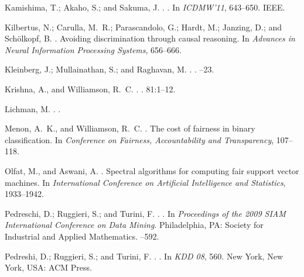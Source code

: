 \documentclass[letterpaper]{article} %
\begin{document}
\begin{thebibliography}{}
Kamishima, T.; Akaho, S.; and Sakuma, J.
.
.
\newblock In {\em ICDMW'11},  643--650.
\newblock IEEE.

Kilbertus, N.; Carulla, M.~R.; Parascandolo, G.; Hardt, M.; Janzing, D.; and
  Sch{\"o}lkopf, B.
.
\newblock Avoiding discrimination through causal reasoning.
\newblock In {\em Advances in Neural Information Processing Systems},
  656--666.

Kleinberg, J.; Mullainathan, S.; and Raghavan, M.
.
.
--23.

Krishna, A., and Williamson, R.~C.
.
.
 81:1--12.

Lichman, M.
.
.

Menon, A.~K., and Williamson, R.~C.
.
\newblock The cost of fairness in binary classification.
\newblock In {\em Conference on Fairness, Accountability and Transparency},
  107--118.

Olfat, M., and Aswani, A.
.
\newblock Spectral algorithms for computing fair support vector machines.
\newblock In {\em International Conference on Artificial Intelligence and
  Statistics},  1933--1942.

Pedreschi, D.; Ruggieri, S.; and Turini, F.
.
.
\newblock In {\em Proceedings of the 2009 SIAM International Conference on Data
  Mining}. Philadelphia, PA: Society for Industrial and Applied Mathematics.
--592.

Pedreshi, D.; Ruggieri, S.; and Turini, F.
.
.
\newblock In {\em KDD 08},  560.
\newblock New York, New York, USA: ACM Press.


\end{thebibliography}
\end{document}
